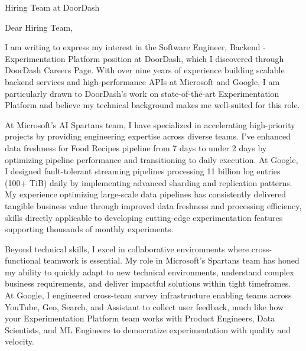 
\newcommand{\COMPANY}{DoorDash}
\newcommand{\POSITION}{Software Engineer, Backend - Experimentation Platform}
\newcommand{\SOURCE}{DoorDash Careers Page}
\newcommand{\PRODUCT}{state-of-the-art Experimentation Platform}
\newcommand{\SPECIFICREASON}{your team's groundbreaking work on democratizing experimentation with quality and velocity, as highlighted in your publications about increasing logistics experiment capacity by 1000\% through parallelization and increased sensitivity}
\newcommand{\RELEVANTTECHNOLOGY}{large-scale data processing and statistical analysis systems}
\newcommand{\TEAMNAME}{Experimentation Analysis Platform team}

\noindent Hiring Team at \COMPANY
\vspace{0.4cm}

\noindent Dear Hiring Team,
\vspace{0.4cm}

I am writing to express my interest in the \POSITION{} position at \COMPANY, which I discovered through \SOURCE. With over nine years of experience building scalable backend services and high-performance APIs at Microsoft and Google, I am particularly drawn to \COMPANY's work on \PRODUCT{} and believe my technical background makes me well-suited for this role.

At Microsoft's AI Spartans team, I have specialized in accelerating high-priority projects by providing engineering expertise across diverse teams. I've enhanced data freshness for Food Recipes pipeline from 7 days to under 2 days by optimizing pipeline performance and transitioning to daily execution. At Google, I designed fault-tolerant streaming pipelines processing 11 billion log entries (100+ TiB) daily by implementing advanced sharding and replication patterns. My experience optimizing large-scale data pipelines has consistently delivered tangible business value through improved data freshness and processing efficiency, skills directly applicable to developing cutting-edge experimentation features supporting thousands of monthly experiments.

Beyond technical skills, I excel in collaborative environments where cross-functional teamwork is essential. My role in Microsoft's Spartans team has honed my ability to quickly adapt to new technical environments, understand complex business requirements, and deliver impactful solutions within tight timeframes. At Google, I engineered cross-team survey infrastructure enabling teams across YouTube, Geo, Search, and Assistant to collect user feedback, much like how your Experimentation Platform team works with Product Engineers, Data Scientists, and ML Engineers to democratize experimentation with quality and velocity.

